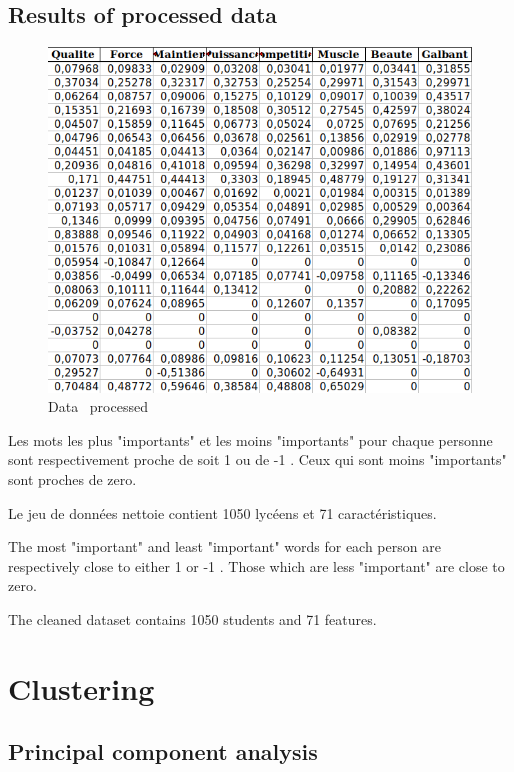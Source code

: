 \documentclass[12pt]{article}
\begin{document}
\subsection{Results of processed data}

\begin{figure}[h]
\begin{center}
\includegraphics[scale=0.7]{donnée_nettoyé.png} 
\caption[]{Data \ processed }
\end{center}
\end{figure}



Les mots les plus "importants"  et les moins "importants" pour chaque personne sont respectivement proche de soit 1 ou de -1 . Ceux qui  sont  moins "importants" sont proches de zero.

Le jeu de données nettoie contient 1050
lycéens et 71 caractéristiques.

The most "important" and least "important" words for each person are respectively close to either 1 or -1 . Those which are less "important" are close to zero.

The cleaned dataset contains 1050
students and 71 features.


\section{Clustering} 


\subsection{Principal component analysis}
\end{document}
